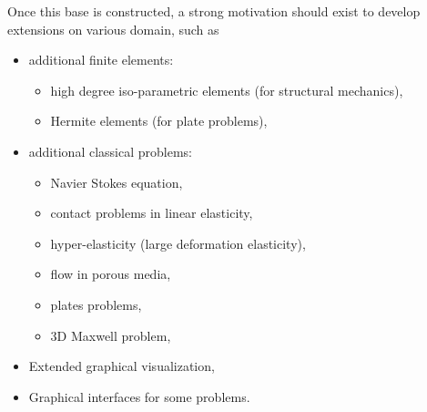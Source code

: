 \documentclass[11pt,a4paper]{article}
\begin{document}
Once this base is constructed, a strong motivation should exist to develop
extensions on various domain, such as
\begin{itemize}
\item  additional finite elements:
\begin{itemize}
\item  high degree iso-parametric elements (for structural mechanics),

\item  Hermite elements (for plate problems),
\end{itemize}

\item  additional classical problems:
\begin{itemize}
\item  Navier Stokes equation,

\item  contact problems in linear elasticity,

\item  hyper-elasticity (large deformation elasticity),

\item  flow in porous media,

\item  plates problems,

\item  3D Maxwell problem,
\end{itemize}

\item  Extended graphical visualization,

\item  Graphical interfaces for some problems.
\end{itemize}
\end{document}

